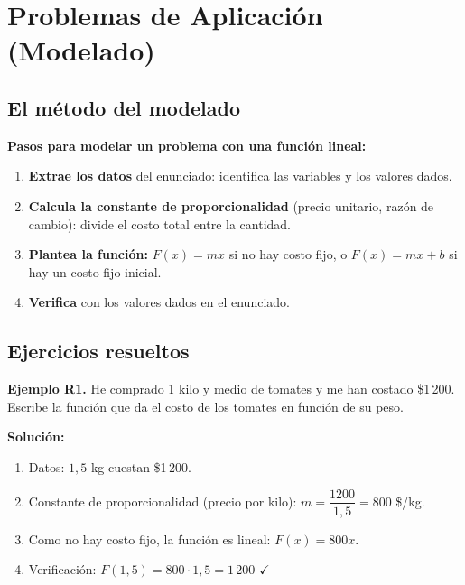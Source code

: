 \documentclass[12pt, letterpaper]{article}
\begin{document}
\section{Problemas de Aplicación (Modelado)}

\subsection{El método del modelado}

\begin{cuadropasos}
  \textbf{Pasos para modelar un problema con una función lineal:}
  \begin{enumerate}[leftmargin=*]
    \item \textbf{Extrae los datos} del enunciado: identifica las variables y los valores dados.
    \item \textbf{Calcula la constante de proporcionalidad} (precio unitario, razón de cambio): divide el costo total entre la cantidad.
    \item \textbf{Plantea la función:} $F(x) = mx$ si no hay costo fijo, o $F(x) = mx + b$ si hay un costo fijo inicial.
    \item \textbf{Verifica} con los valores dados en el enunciado.
  \end{enumerate}
\end{cuadropasos}

\subsection{Ejercicios resueltos}

\textbf{Ejemplo R1.} He comprado 1 kilo y medio de tomates y me han costado \$1\,200. Escribe la función que da el costo de los tomates en función de su peso.

\begin{cuadrosolucion}
  \textbf{Solución:}
  \begin{enumerate}
    \item Datos: $1{,}5$ kg cuestan \$1\,200.
    \item Constante de proporcionalidad (precio por kilo): $m = \dfrac{1200}{1{,}5} = 800$ \$/kg.
    \item Como no hay costo fijo, la función es lineal: $F(x) = 800x$.
    \item Verificación: $F(1{,}5) = 800 \cdot 1{,}5 = 1\,200$ $\checkmark$
  \end{enumerate}
\end{cuadrosolucion}
\end{document}
